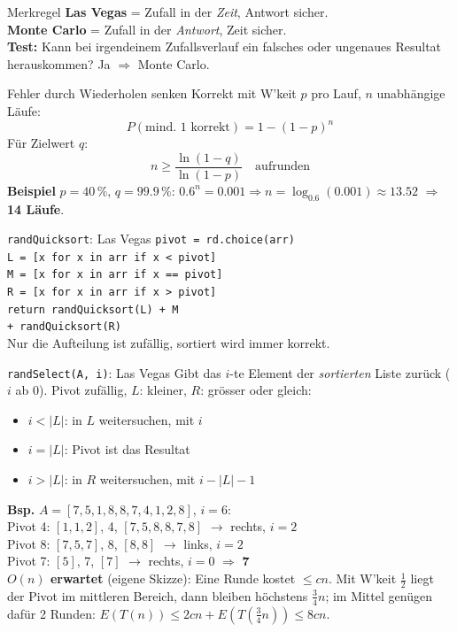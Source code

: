 \documentclass[a4paper, fontsize=7pt]{scrartcl}
\begin{document}
\begin{subbox}{Merkregel}
\textbf{Las Vegas} = Zufall in der \emph{Zeit}, Antwort sicher.\\
\textbf{Monte Carlo} = Zufall in der \emph{Antwort}, Zeit sicher.\\
\textbf{Test:} Kann bei irgendeinem Zufallsverlauf ein falsches oder ungenaues
Resultat herauskommen? Ja $\Rightarrow$ Monte Carlo.
\end{subbox}

\begin{mainbox}{Fehler durch Wiederholen senken}
Korrekt mit W'keit $p$ pro Lauf, $n$ unabhängige Läufe:
$$P(\text{mind.\ 1 korrekt}) = 1 - (1 - p)^n$$
Für Zielwert $q$:
$$\boxed{n \ge \frac{\ln(1 - q)}{\ln(1 - p)}} \quad \text{aufrunden}$$
\textbf{Beispiel} $p = 40\,\%$, $q = 99.9\,\%$:
$0.6^n = 0.001 \Rightarrow n = \log_{0.6}(0.001) \approx 13.52$
$\Rightarrow$ \textbf{14 Läufe}.
\end{mainbox}

\begin{subbox}{\texttt{randQuicksort}: Las Vegas}
\texttt{pivot = rd.choice(arr)}\\
\texttt{L = [x for x in arr if x < pivot]}\\
\texttt{M = [x for x in arr if x == pivot]}\\
\texttt{R = [x for x in arr if x > pivot]}\\
\texttt{return randQuicksort(L) + M}\\
\phantom{xx}\texttt{+ randQuicksort(R)}\\[2pt]
Nur die Aufteilung ist zufällig, sortiert wird immer korrekt.
\end{subbox}

\begin{subbox}{\texttt{randSelect(A, i)}: Las Vegas}
Gibt das $i$-te Element der \emph{sortierten} Liste zurück ($i$ ab 0). Pivot zufällig,
$L$: kleiner, $R$: grösser oder gleich:
\begin{itemize}
    \item $i < |L|$: in $L$ weitersuchen, mit $i$
    \item $i = |L|$: Pivot ist das Resultat
    \item $i > |L|$: in $R$ weitersuchen, mit $i - |L| - 1$
\end{itemize}
\textbf{Bsp.} $A = [7,5,1,8,8,7,4,1,2,8]$, $i = 6$:\\
Pivot 4: $[1,1,2]$, 4, $[7,5,8,8,7,8]$ $\to$ rechts, $i = 2$\\
Pivot 8: $[7,5,7]$, 8, $[8,8]$ $\to$ links, $i = 2$\\
Pivot 7: $[5]$, 7, $[7]$ $\to$ rechts, $i = 0$ $\Rightarrow$ \textbf{7}\\[2pt]
\textbf{$O(n)$ erwartet} (eigene Skizze): Eine Runde kostet $\le cn$. Mit W'keit
$\frac{1}{2}$ liegt der Pivot im mittleren Bereich, dann bleiben höchstens
$\frac{3}{4} n$; im Mittel genügen dafür 2 Runden:
$E(T(n)) \le 2cn + E(T(\frac{3}{4} n)) \le 8cn$.
\end{subbox}
\end{document}
